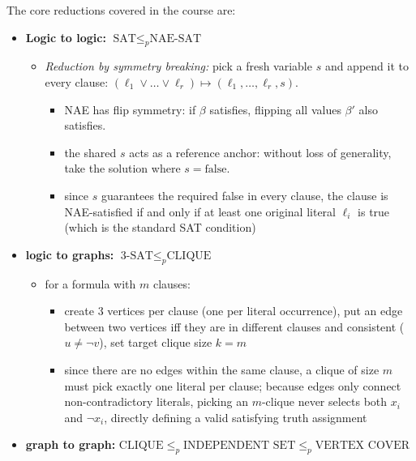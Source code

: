 \documentclass[a4paper, 11pt]{report}
\begin{document}
The core reductions covered in the course are:
\begin{itemize}
\item \textbf{Logic to logic:} $\text{SAT} \le_p \text{NAE-SAT}$
    \begin{itemize}
        \item \textit{Reduction by symmetry breaking:} pick a fresh variable $s$ and append it to every clause: $(\ell_1 \lor \dots \lor \ell_r) \mapsto (\ell_1, \dots, \ell_r, s)$.
        \begin{itemize}
            \item NAE has flip symmetry: if $\beta$ satisfies, flipping all values $\beta'$ also satisfies.
            \item the shared $s$ acts as a reference anchor: without loss of generality, take the solution where $s = \text{false}$.
            \item since $s$ guarantees the required false in every clause, the clause is NAE-satisfied if and only if at least one original literal $\ell_i$ is true (which is the standard SAT condition)
        \end{itemize}
    \end{itemize}
\item \textbf{logic to graphs:} $\text{3-SAT} \le_p \text{CLIQUE}$
    \begin{itemize}
        \item for a formula with $m$ clauses:
        \begin{itemize}
            \item create 3 vertices per clause (one per literal occurrence), put an edge between two vertices iff they are in different clauses and consistent ($u \neq \neg v$), set target clique size $k = m$
            \item since there are no edges within the same clause, a clique of size $m$ must pick exactly one literal per clause; because edges only connect non-contradictory literals, picking an $m$-clique never selects both $x_i$ and $\neg x_i$, directly defining a valid satisfying truth assignment
        \end{itemize}
    \end{itemize}
\item \textbf{graph to graph:} $\text{CLIQUE} \le_p \text{INDEPENDENT SET} \le_p \text{VERTEX COVER}$


\end{itemize}
\end{document}
